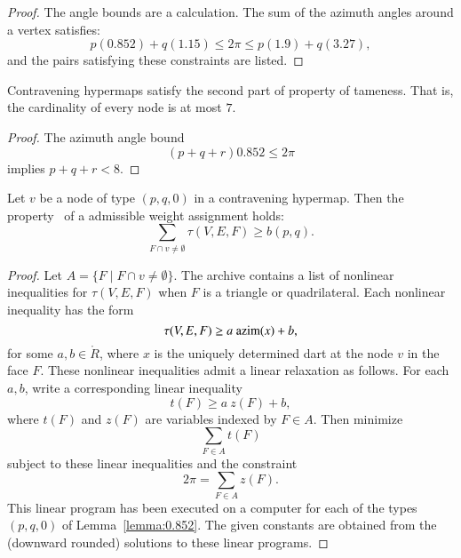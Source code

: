 \begin{proof}
The angle bounds are a calculation.  The sum of the azimuth angles
around a vertex satisfies:
$$
  p (0.852) + q (1.15) \le 2\pi \le p (1.9) + q (3.27),
$$
and the pairs satisfying these constraints are listed.
\end{proof}

\begin{lemma}\label{lemma:node-upper}
Contravening hypermaps satisfy the second part of property 
of tameness.  That is, the cardinality of every
node is at most $7$.
\end{lemma}

\begin{proof}  The azimuth angle bound
$$
 (p+q+r) 0.852 \le 2\pi
$$
implies $p+q+r < 8$.
\end{proof}




\begin{lemma} \label{lemma:weightB}
Let $v$ be a node of type $(p,q,0)$ in a contravening hypermap.    Then the property~ of a admissible weight assignment holds:
$$
\sum_{ F\cap v\ne \emptyset} \tau(V,E,F) \ge  b(p,q).
$$
\end{lemma}
%
%
%

\begin{proof} Let $A =\{F\mid F\cap v\ne\emptyset\}$.  The archive \cite[FUSDSPJ]{hales:2009:nonlinear} contains a list of nonlinear inequalities
for $\tau(V,E,F)$ when $F$ is a triangle or quadrilateral. Each nonlinear inequality has the form
%
$$\tau(V,E,F) \ge a~{\operatorname{azim}}(x) + b,$$
for some $a,b\in\ring{R}$, where $x$ is the uniquely determined dart at the node $v$ in the face $F$.  These nonlinear inequalities admit a linear relaxation as follows.  For each $a,b$,  write a corresponding linear inequality
%
%
%
$$
t(F) \ge a~z(F) + b,
$$
where $t(F)$ and $z(F)$ are variables indexed by $F\in A$.
%
%
%
Then  minimize 
$$\sum_{F\in A} t(F)$$
subject to these linear inequalities and the constraint
$$
2\pi = \sum_{F\in A} z(F).
$$
This linear program has been executed on a computer for each of the types $(p,q,0)$ of Lemma~\ref{lemma:0.852}. The given constants are obtained from the (downward rounded) solutions to these linear programs.
\end{proof}

